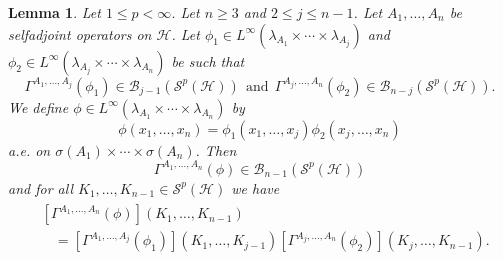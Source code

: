 \documentclass[12pt]{amsart}
\newtheorem{lemma}[theorem]{Lemma}
\theoremstyle{remark}
\begin{document}
\begin{lemma}\label{simplificationsep}
Let $1 \leq p < \infty$. Let $n \geq 3$ and $2\leq j \leq n-1$. Let $A_1, \ldots, A_n$ be selfadjoint operators on $\mathcal{H}$. Let $\phi_1 \in L^{\infty}(\lambda_{A_1} \times \cdots \times \lambda_{A_j})$ and $\phi_2 \in L^{\infty}(\lambda_{A_j} \times \cdots \times \lambda_{A_n})$ be such that
$$
\Gamma^{A_1, \ldots, A_j}(\phi_1) \in \mathcal{B}_{j-1}(\mathcal{S}^p(\mathcal{H})) \ \
\text{and} \ \
\Gamma^{A_j, \ldots, A_n}(\phi_2) \in \mathcal{B}_{n-j}(\mathcal{S}^p(\mathcal{H})).
$$
We define $\phi \in L^{\infty}(\lambda_{A_1} \times \cdots \times \lambda_{A_n})$ by
\begin{equation*}
\phi(x_1,\ldots, x_n) = \phi_1(x_1, \ldots, x_j) \phi_2(x_j, \ldots, x_n)
\end{equation*}
a.e. on $\sigma(A_1) \times \cdots \times \sigma(A_n)$.
Then
$$
\Gamma^{A_1, \ldots, A_n}(\phi) \in \mathcal{B}_{n-1}(\mathcal{S}^p(\mathcal{H}))
$$
and for all $K_1, \ldots, K_{n-1} \in \mathcal{S}^p(\mathcal{H})$ we have
\begin{align}\label{simplificationsepid}
\begin{split}
& \left[ \Gamma^{A_1, \ldots, A_n}(\phi)\right] (K_1, \ldots, K_{n-1}) \\
& \ \ \ \ = \left[ \Gamma^{A_1, \ldots, A_j}(\phi_1)\right] (K_1, \ldots, K_{j-1}) \left[ \Gamma^{A_j, \ldots, A_n}(\phi_2)\right] (K_j, \ldots, K_{n-1}).
\end{split}
\end{align}
\end{lemma}
\end{document}
